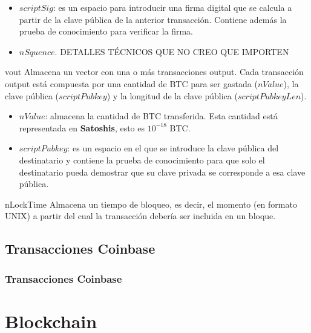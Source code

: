 \documentclass{beamer}
\theoremstyle{definition}
\begin{document}
\begin{frame}
	\begin{itemize}
		\item<1-> $scriptSig$: es un espacio para introducir una firma digital que se calcula a partir de la clave pública de la anterior transacción. Contiene además la prueba de conocimiento para verificar la firma. %
		\item<2-> $nSquence$. DETALLES TÉCNICOS QUE NO CREO QUE IMPORTEN
		\end{itemize}
\end{frame}

\begin{frame}
	\begin{block}{vout}
		Almacena un vector con una o más transacciones output. Cada transacción output está compuesta por una cantidad de BTC para ser gastada ($nValue$), la clave pública ($scriptPubkey$) y la longitud de la clave pública ($scriptPubkeyLen$).
	\end{block}
\begin{itemize}
	\item<2-> $nValue$: almacena la cantidad de BTC transferida. Esta cantidad está representada en \textbf{Satoshis}, esto es $10^{-18}$ BTC.
	\item<3->$scriptPubkey$: es un espacio en el que se introduce la clave pública del destinatario y contiene la prueba de conocimiento para que solo el destinatario pueda demostrar que su clave privada se corresponde a esa clave pública.
\end{itemize}
	
\end{frame}

\begin{frame}

	\begin{block}{nLockTime}
		Almacena un tiempo de bloqueo, es decir, el momento (en formato UNIX) a partir del cual la transacción debería ser incluida en un bloque.
	\end{block}
\end{frame}

\subsection{Transacciones Coinbase}
\begin{frame}
	\frametitle{Transacciones Coinbase}
\end{frame}
\section{Blockchain}
\end{document}
